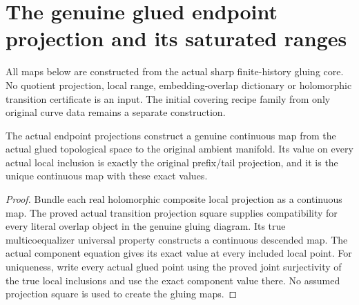 \section{The genuine glued endpoint projection and its saturated ranges}

All maps below are constructed from the actual sharp finite-history gluing
core. No quotient projection, local range, embedding-overlap dictionary or
holomorphic transition certificate is an input. The initial covering recipe
family from only original curve data remains a separate construction.

\begin{theorem}
\label{hir:sharp-actual-endpoint-glued-projection}
\leanok
{}
The actual endpoint projections construct a genuine continuous map from the
actual glued topological space to the original ambient manifold. Its value
on every actual local inclusion is exactly the original prefix/tail
projection, and it is the unique continuous map with these exact values.
\end{theorem}
\begin{proof}
Bundle each real holomorphic composite local projection as a continuous map.
The proved actual transition projection square supplies compatibility for
every literal overlap object in the genuine gluing diagram. Its true
multicoequalizer universal property constructs a continuous descended map.
The actual component equation gives its exact value at every included local
point. For uniqueness, write every actual glued point using the proved
joint surjectivity of the true local inclusions and use the exact component
value there. No assumed projection square is used to create the gluing maps.
\end{proof}

